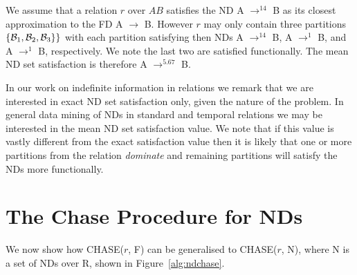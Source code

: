 \begin{example}
\begin{rm}
We assume that a relation $r$ over $AB$ satisfies the ND A $\to^{14}$ B
as its closest approximation to the FD A $\to$ B. However $r$ may only
contain three partitions  $\{{\cal B}_1, {\cal B}_2, {\cal B}_3\}\}$
with each partition satisfying then NDs A $\to^{14}$ B, A $\to^{1}$ B,
and A $\to^{1}$ B, respectively. We note the last two are satisfied
functionally. The mean ND set satisfaction is therefore A $\to^{5.67}$ B.
\end{rm}
\end{example}

In our work on indefinite information in relations we remark that we
are interested in exact ND set satisfaction only, given the nature of
the problem. In general data mining of NDs in standard and temporal
relations we may be interested in the mean ND set satisfaction
value. We note that if this value is vastly different from the exact
satisfaction value then it is likely that one or more partitions from
the relation {\em dominate} and remaining partitions will satisfy the
NDs more functionally.

\section{The Chase Procedure for NDs}\label{sec:nd_chase}

We now show how CHASE($r$, F) can be generalised to CHASE($r$, N), where N is
a set of NDs over R, shown in Figure~\ref{alg:ndchase}.

